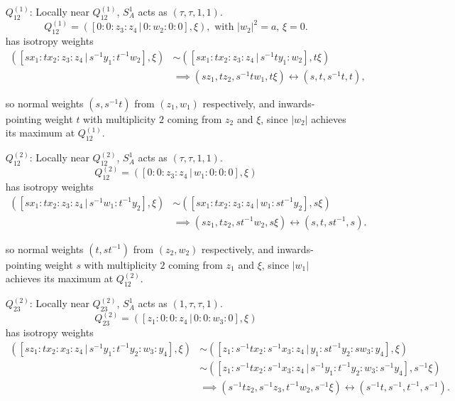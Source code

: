 \documentclass{article}
\begin{document}
	\begin{itemize}
		\item[$Q_{12}^{(1)}$:]
		Locally near $Q_{12}^{(1)}$, $S^{1}_{A}$ acts as $(\tau, \tau, 1, 1)$.
		\[
			Q_{12}^{(1)} = \left( [ 0 : 0 : z_{3} : z_{4} \, | \, 0 : w_{2} : 0 : 0 ], \xi \right), \text{ with } |w_{2}|^{2} = a,\, \xi = 0.
		\]
		has isotropy weights
		\begin{align*}
			\left( [sx_{1} : tx_{2} : z_{3} : z_{4} \, | \, s^{-1}y_{1} : t^{-1}w_{2}], \xi \right) &\sim \left( [sx_{1} : tx_{2} : z_{3} : z_{4} \, | \, s^{-1}ty_{1} : w_{2}], t\xi \right) \\ &\implies (sz_{1}, tz_{2}, s^{-1}tw_{1}, t\xi) \longleftrightarrow (s, t, s^{-1}t, t),
		\end{align*}
	
		so normal weights $(s, s^{-1}t)$ from $(z_{1}, w_{1})$ respectively, and inwards-pointing weight $t$ with multiplicity $2$ coming from $z_{2}$ and $\xi$, since $|w_{2}|$ achieves its maximum at $Q_{12}^{(1)}$.
	
		\item[$Q_{12}^{(2)}$:]
		Locally near $Q_{12}^{(2)}$, $S^{1}_{A}$ acts as $(\tau, \tau, 1, 1)$.
		\[
			Q_{12}^{(2)} = \left( [ 0 : 0 : z_{3} : z_{4} \, | \, w_{1} : 0 : 0 : 0 ], \xi \right)
		\]
		has isotropy weights
		\begin{align*}
			\left( [sx_{1} : tx_{2} : z_{3} : z_{4} \, | \, s^{-1}w_{1} : t^{-1}y_{2}], \xi \right) &\sim \left( [sx_{1} : tx_{2} : z_{3} : z_{4} \, | \, w_{1} : st^{-1}y_{2} ], s\xi \right) \\ &\implies (sz_{1}, tz_{2}, st^{-1}w_{2}, s\xi) \longleftrightarrow (s, t, st^{-1}, s).
		\end{align*}
	
		so normal weights $(t, st^{-1})$ from $(z_{2}, w_{2})$ respectively, and inwards-pointing weight $s$ with multiplicity $2$ coming from $z_{1}$ and $\xi$, since $|w_{1}|$ achieves its maximum at $Q_{12}^{(2)}$.
	
		\item[$Q_{23}^{(2)}$:]
		Locally near $Q_{23}^{(2)}$, $S^{1}_{A}$ acts as $(1, \tau, \tau, 1)$.
		\[
		Q_{23}^{(2)} = \left( [ z_{1} : 0 : 0 : z_{4} \, | \, 0 : 0 : w_{3} : 0 ], \xi \right)
		\]
		has isotropy weights
		\begin{align*}
			\left( [sz_{1} : tx_{2} : x_{3} : z_{4} \, | \, s^{-1}y_{1} : t^{-1}y_{2} : w_{3} : y_{4}], \xi \right) &\sim \left( [z_{1} : s^{-1}tx_{2} : s^{-1}x_{3} : z_{4} \, | \, y_{1} : st^{-1}y_{2} : sw_{3} : y_{4} ], \xi \right) \\ &\sim \left( [z_{1} : s^{-1}tx_{2} : s^{-1}x_{3} : z_{4} \, | \, s^{-1}y_{1} : t^{-1}y_{2} : w_{3} : s^{-1}y_{4} ], s^{-1}\xi \right) \\ &\implies (s^{-1}tz_{2}, s^{-1}z_{3}, t^{-1}w_{2}, s^{-1}\xi) \longleftrightarrow (s^{-1}t, s^{-1}, t^{-1}, s^{-1}).
		\end{align*}
	

\end{itemize}
\end{document}
